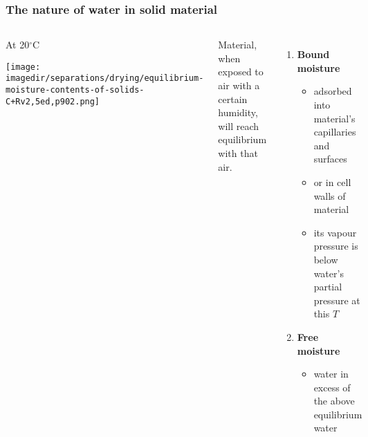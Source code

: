 \begin{frame}\frametitle{The nature of water in solid material}
	\begin{columns}[c]
			
			\begin{center}
				At 20$^\circ\text{C}$
				
				\texttt{[image: \\imagedir/separations/drying/equilibrium-moisture-contents-of-solids-C+Rv2,5ed,p902.png]}
			\end{center}
			\vspace{-12pt}
			Material, when exposed to air with a certain humidity, will reach equilibrium with that air.
			
			\vspace{12pt}
			
			\begin{enumerate}
				\item	\textbf{Bound moisture}
				\begin{itemize}
					\item	adsorbed into material's capillaries and surfaces
					\item	or in cell walls of material
					\item	its vapour pressure is below water's partial pressure at this $T$
				\end{itemize}
				\item	\textbf{Free moisture}
				\begin{itemize}
					\item	water in excess of the above equilibrium water
				\end{itemize}
			\end{enumerate}
	\end{columns}
\end{frame}

